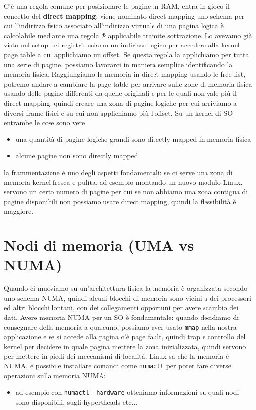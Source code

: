 \documentclass[12pt, oneside]{extbook}
\begin{document}
C'è una regola comune per posizionare le pagine in RAM, entra in gioco il concetto del \textbf{direct mapping}: viene nominato direct mapping uno schema per cui l'indirizzo fisico associato all'indirizzo virtuale di una pagina logica è calcolabile mediante una regola $\Phi$ applicabile tramite sottrazione. Lo avevamo già visto nel setup dei registri: usiamo un indirizzo logico per accedere alla kernel page table a cui applichiamo un offset. Se questa regola la applichiamo per tutta una serie di pagine, possiamo lavorarci in maniera semplice identificando la memoria fisica. Raggiungiamo la memoria in direct mapping usando le free list, potremo andare a cambiare la page table per arrivare sulle zone di memoria fisica usando delle pagine differenti da quelle originali e per le quali non vale più il direct mapping, quindi creare una zona di pagine logiche per cui arriviamo a diversi frame fisici e su cui non applichiamo più l'offset. Su un kernel di SO entrambe le cose sono vere
\begin{itemize}
\item una quantità di pagine logiche grandi sono directly mapped in memoria fisica
\item alcune pagine non sono directly mapped
\end{itemize}
la frammentazione è uno degli aspetti fondamentali: se ci serve una zona di memoria kernel fresca e pulita, ad esempio montando un nuovo modulo Linux, servono un certo numero di pagine per cui se non abbiamo una zona contigua di pagine disponibili non possiamo usare direct mapping, quindi la flessibilità è maggiore. 
\section{Nodi di memoria (UMA vs NUMA)}
Quando ci muoviamo su un'architettura fisica la memoria è organizzata secondo uno schema NUMA, quindi alcuni blocchi di memoria sono vicini a dei processori ed altri blocchi lontani, con dei collegamenti opportuni per avere scambio dei dati. Avere memoria NUMA per un SO è fondamentale: quando decidiamo di consegnare della memoria a qualcuno, possiamo aver usato \texttt{mmap} nella nostra applicazione e se si accede alla pagina c'è page fault, quindi trap e controllo del kernel per decidere in quale pagina mettere la zona inizializzata, quindi servono per mettere in piedi dei meccanismi di località. Linux sa che la memoria è NUMA, è possibile installare comandi come \texttt{numactl} per poter fare diverse operazioni sulla memoria NUMA:
\begin{itemize}
\item ad esempio con \texttt{numactl --hardware} otteniamo informazioni su quali nodi sono disponibili, sugli hypertheads etc...
\end{itemize}
\end{document}

